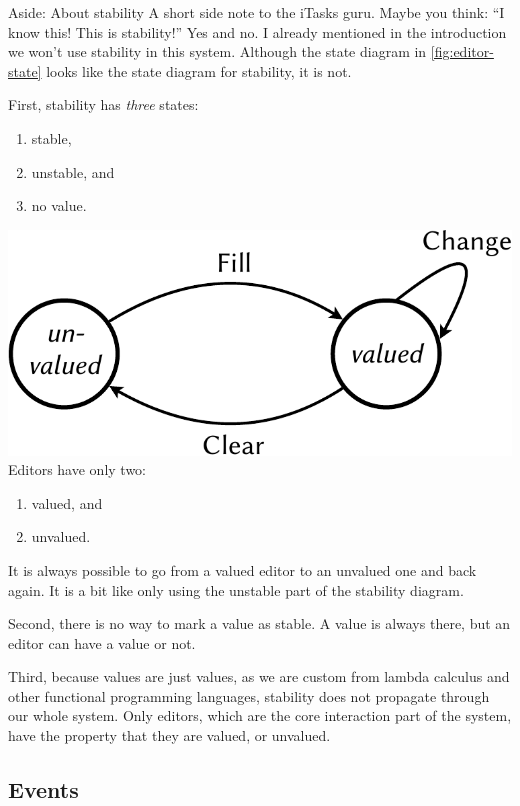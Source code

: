 \begin{margintext}{Aside: About stability}
A short side note to the iTasks guru.
Maybe you think: \enquote{I know this! This is stability!}
Yes and no.
I already mentioned in the introduction we won't use stability in this system.
Although the state diagram in \autoref{fig:editor-state} looks like the state diagram for stability,
it is not.

First, stability has \emph{three} states:
\begin{enumerate}
  \item stable,
  \item unstable, and
  \item no value.
\end{enumerate}
\includegraphics[width=\marginwidth,page=2]{figures/editor-state-crop.pdf}
Editors have only two:
\begin{enumerate}
  \item valued, and
  \item unvalued.
\end{enumerate}
It is always possible to go from a valued editor to an unvalued one and back again.
It is a bit like only using the unstable part of the stability diagram.

Second,
there is no way to mark a value as stable.
A value is always there,
but an editor can have a value or not.

Third,
because values are just values,
as we are custom from lambda calculus and other functional programming languages,
stability does not propagate through our whole system.
Only editors,
which are the core interaction part of the system,
have the property that they are valued, or unvalued.
\end{margintext}


\subsection{Events}

